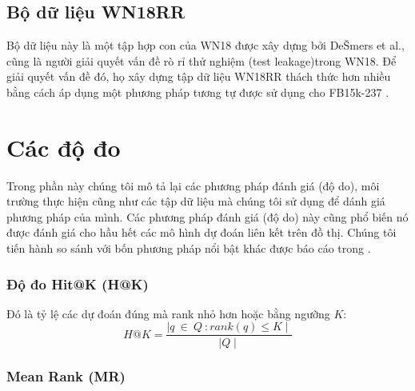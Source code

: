 
\subsection{Bộ dữ liệu WN18RR}

Bộ dữ liệu này là một tập hợp con của WN18 được xây dựng bởi DeŠmers et al.\cite{dettmers2017convolutional}, cũng là người giải quyết vấn đề rò rỉ thử nghiệm (test leakage)trong WN18. Để giải quyết vấn đề đó, họ xây dựng tập dữ liệu WN18RR thách thức hơn nhiều bằng cách áp dụng một phương pháp tương tự được sử dụng cho FB15k-237 \cite{toutanova2015observed}. 


\section{Các độ đo}
Trong phần này chúng tôi mô tả lại các phương pháp đánh giá (độ do), môi trường thực hiện cũng như các tập dữ liệu mà chúng tôi sử dụng để dánh giá phương pháp của mình. Các phương pháp đánh giá (độ do) này cũng phổ biến nó được đánh giá cho hầu hết các mô hình dự đoán liên kết trên đồ thị. Chúng tôi tiến hành so sánh với bốn phương pháp nổi bật khác được báo cáo trong \cite{rossi2020knowledge}.

\subsubsection{Độ đo Hit@K (H@K)}

Đó là tỷ lệ các dự đoán đúng mà rank nhỏ hơn hoặc bằng ngưỡng \(K\):
\[H@K = \frac{\mid {q ~\in ~Q~: rank(q) \leq K} \mid}{\mid Q \mid}\]

\subsubsection{Mean Rank (MR)}


